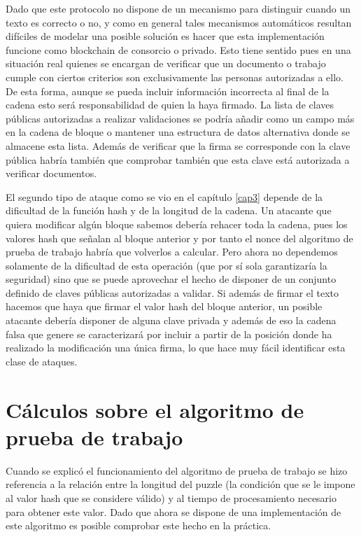 Dado que este protocolo no dispone de un mecanismo para distinguir cuando un texto es correcto o no, y como en general tales mecanismos automáticos resultan difíciles de modelar una posible solución es hacer que esta implementación funcione como blockchain de consorcio o privado. Esto tiene sentido pues en una situación real quienes se encargan de verificar que un documento o trabajo cumple con ciertos criterios son exclusivamente las personas autorizadas a ello. De esta forma, aunque se pueda incluir información incorrecta al final de la cadena esto será responsabilidad de quien la haya firmado. La lista de claves públicas autorizadas a realizar validaciones se podría añadir como un campo más en la cadena de bloque o mantener una estructura de datos alternativa donde se almacene esta lista. Además de verificar que la firma se corresponde con la clave pública habría también que comprobar también que esta clave está autorizada a verificar documentos.

El segundo tipo de ataque como se vio en el capítulo \ref{cap3} depende de la dificultad de la función hash y de la longitud de la cadena. Un atacante que quiera modificar algún bloque sabemos debería rehacer toda la cadena, pues los valores hash que señalan al bloque anterior y por tanto el nonce del algoritmo de prueba de trabajo habría que volverlos a calcular. Pero ahora no dependemos solamente de la dificultad de esta operación (que por sí sola garantizaría la seguridad) sino que se puede aprovechar el hecho de disponer de un conjunto definido de claves públicas autorizadas a validar. Si además de firmar el texto hacemos que haya que firmar el valor hash del bloque anterior, un posible atacante debería disponer de alguna clave privada y además de eso la cadena falsa que genere se caracterizará por incluir a partir de la posición donde ha realizado la modificación una única firma, lo que hace muy fácil identificar esta clase de ataques.


\section{Cálculos sobre el algoritmo de prueba de trabajo}
Cuando se explicó el funcionamiento del algoritmo de prueba de trabajo se hizo referencia a la relación entre la longitud del puzzle (la condición que se le impone al valor hash que se considere válido) y al tiempo de procesamiento necesario para obtener este valor. Dado que ahora se dispone de una implementación de este algoritmo es posible comprobar este hecho en la práctica.

